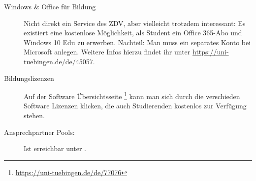 \begin{description}
   
   \item[Windows \& Office für Bildung] Nicht direkt ein Service des ZDV, aber vielleicht trotzdem interessant: Es existiert eine kostenlose Möglichkeit, als Student ein Office 365-Abo und Windows 10 Edu zu erwerben. Nachteil: Man muss ein separates Konto bei Microsoft anlegen. Weitere Infos hierzu findet ihr unter \url{https://uni-tuebingen.de/de/45057}.	%


  \item[Bildungslizenzen] Auf der Software Übersichtsseite \footnote{\url{https://uni-tuebingen.de/de/77076}} kann man sich durch die verschieden Software Lizenzen klicken, die auch Studierenden kostenlos zur Verfügung stehen.

  \item[Ansprechpartner Pools:]
    Ist erreichbar unter .

	
\end{description}
